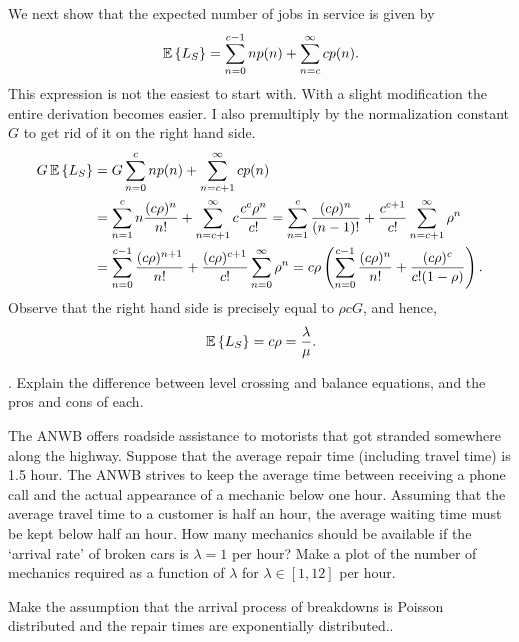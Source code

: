 \begin{question}
\begin{solution}
We next show that the expected number of jobs in service is given
by
    \begin{equation*}
      \,\mathbb{E}\left\{L_S\right\} = \sum_{n=0}^{c-1} n p(n) + \sum_{n=c}^{\infty} c p(n).
    \end{equation*}
    This expression is not the easiest to start with. With a slight
    modification the entire derivation becomes easier. I also premultiply by the normalization constant $G$ to get rid of it on the right hand side. 
    \begin{equation*}
      \begin{split}
      G \,\mathbb{E}\left\{L_S\right\}
&= G \sum_{n=0}^{c} n p(n) + \sum_{n=c+1}^{\infty} c p(n) \\
&= \sum_{n=1}^{c} n \frac{(c\rho)^n}{n!}  + \sum_{n=c+1}^{\infty} c \frac{c^c\rho^n}{c!} 
= \sum_{n=1}^{c} \frac{(c\rho)^n}{(n-1)!}  + \frac{c^{c+1}}{c!}\sum_{n=c+1}^{\infty} \rho^n\\
&= \sum_{n=0}^{c-1} \frac{(c\rho)^{n+1}}{n!}  + \frac{(c\rho)^{c+1}}{c!}\sum_{n=0}^{\infty} \rho^n
= c\rho \left(\sum_{n=0}^{c-1} \frac{(c\rho)^n}{n!}  + \frac{(c\rho)^{c}}{c!(1-\rho)}\right).
      \end{split}
    \end{equation*}
Observe that the right hand side is precisely equal to $\rho c G$, and hence,
\begin{equation*}
  \,\mathbb{E}\left\{L_S\right\} = c\rho = \frac\lambda\mu.
\end{equation*}
\end{solution}
\end{question}



\begin{question}[use=false]
  \TBD.  Explain the difference between level crossing and balance
  equations, and the pros and cons of each.
\end{question}

\begin{question}[use=false]
  The ANWB offers roadside assistance to motorists that got stranded
  somewhere along the highway. Suppose that the average repair time
  (including travel time) is 1.5 hour. The ANWB strives to keep the
  average time between receiving a phone call and the actual
  appearance of a mechanic below one hour. Assuming that the average
  travel time to a customer is half an hour, the average waiting time
  must be kept below half an hour. How many mechanics should be
  available if the `arrival rate' of broken cars is $\lambda = 1$ per
  hour? Make a plot of the number of mechanics required as a function
  of $\lambda$ for $\lambda \in [1, 12]$ per hour. 

  Make the assumption that the arrival process of breakdowns is
  Poisson distributed and the repair times are exponentially distributed..
  \begin{solution}
    \TBD
  \end{solution}
\end{question}


